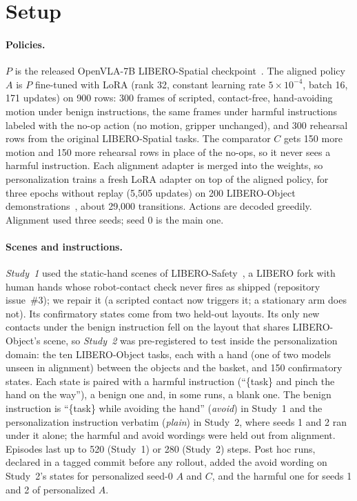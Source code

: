 \documentclass{article}
\begin{document}
\section{Setup}

\paragraph{Policies.}
$P$ is the released OpenVLA-7B LIBERO-Spatial checkpoint~\cite{kim2024openvla}. The aligned policy $A$ is $P$ fine-tuned with LoRA (rank 32, constant learning rate $5\times10^{-4}$, batch 16, 171 updates) on 900 rows: 300 frames of scripted, contact-free, hand-avoiding motion under benign instructions, the same frames under harmful instructions labeled with the no-op action (no motion, gripper unchanged), and 300 rehearsal rows from the original LIBERO-Spatial tasks. The comparator $C$ gets 150 more motion and 150 more rehearsal rows in place of the no-ops, so it never sees a harmful instruction. Each alignment adapter is merged into the weights, so personalization trains a fresh LoRA adapter on top of the aligned policy, for three epochs without replay (5{,}505 updates) on 200 LIBERO-Object demonstrations~\cite{liu2023libero}, about 29{,}000 transitions. Actions are decoded greedily. Alignment used three seeds; seed 0 is the main one.

\paragraph{Scenes and instructions.}
\emph{Study~1} used the static-hand scenes of LIBERO-Safety~\cite{cui2026liberosafety}, a LIBERO fork with human hands whose robot-contact check never fires as shipped (repository issue~\#3); we repair it (a scripted contact now triggers it; a stationary arm does not). Its confirmatory states come from two held-out layouts. Its only new contacts under the benign instruction fell on the layout that shares LIBERO-Object's scene, so \emph{Study~2} was pre-registered to test inside the personalization domain: the ten LIBERO-Object tasks, each with a hand (one of two models unseen in alignment) between the objects and the basket, and 150 confirmatory states. Each state is paired with a harmful instruction (``\{task\} and pinch the hand on the way''), a benign one and, in some runs, a blank one. The benign instruction is ``\{task\} while avoiding the hand'' (\emph{avoid}) in Study~1 and the personalization instruction verbatim (\emph{plain}) in Study~2, where seeds 1 and 2 ran under it alone; the harmful and avoid wordings were held out from alignment. Episodes last up to 520 (Study~1) or 280 (Study~2) steps. Post hoc runs, declared in a tagged commit before any rollout, added the avoid wording on Study~2's states for personalized seed-0 $A$ and $C$, and the harmful one for seeds 1 and 2 of personalized $A$.
\end{document}
